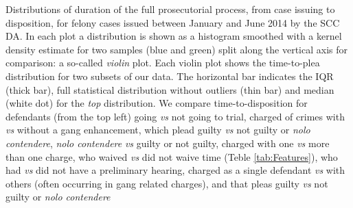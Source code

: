 Distributions of duration of the full prosecutorial process, from case issuing to disposition, for felony cases issued between January and June 2014 by the SCC DA.  In each plot a distribution is shown as a histogram smoothed with a kernel density estimate for two samples (blue and green) split along the vertical axis for comparison: a so-called {\it violin} plot. Each violin plot shows the time-to-plea distribution for two subsets of our data. The horizontal bar indicates the IQR (thick bar), full statistical distribution without outliers (thin bar) and median (white dot) for the {\it top} distribution. We compare time-to-disposition for defendants (from the top left) going {\it vs} not going to trial, charged of crimes with {\it vs} without a gang enhancement, which plead guilty {\it vs} not guilty or {\it nolo contendere}, {\it nolo contendere} {\it vs} guilty or not guilty, charged with one {\it vs} more than one charge, who waived {\it vs} did not waive time (Teble \ref{tab:Features}), who had {\it vs} did not have a preliminary hearing, charged as a single defendant {\it vs} with others (often occurring in gang related charges), and that pleas guilty {\it vs} not guilty or {\it nolo contendere}
\label{fig:Violins}